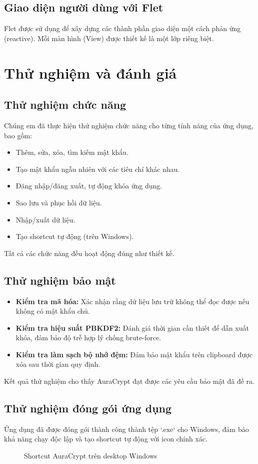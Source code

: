 \subsection{Giao diện người dùng với Flet}
Flet được sử dụng để xây dựng các thành phần giao diện một cách phản ứng (reactive). Mỗi màn hình (View) được thiết kế là một lớp riêng biệt.


\section{Thử nghiệm và đánh giá}
\subsection{Thử nghiệm chức năng}
Chúng em đã thực hiện thử nghiệm chức năng cho từng tính năng của ứng dụng, bao gồm:
\begin{itemize}
    \item Thêm, sửa, xóa, tìm kiếm mật khẩu.
    \item Tạo mật khẩu ngẫu nhiên với các tiêu chí khác nhau.
    \item Đăng nhập/đăng xuất, tự động khóa ứng dụng.
    \item Sao lưu và phục hồi dữ liệu.
    \item Nhập/xuất dữ liệu.
    \item Tạo shortcut tự động (trên Windows).
\end{itemize}
Tất cả các chức năng đều hoạt động đúng như thiết kế.

\subsection{Thử nghiệm bảo mật}
\begin{itemize}
    \item \textbf{Kiểm tra mã hóa:} Xác nhận rằng dữ liệu lưu trữ không thể đọc được nếu không có mật khẩu chủ.
    \item \textbf{Kiểm tra hiệu suất PBKDF2:} Đánh giá thời gian cần thiết để dẫn xuất khóa, đảm bảo độ trễ hợp lý chống brute-force.
    \item \textbf{Kiểm tra làm sạch bộ nhớ đệm:} Đảm bảo mật khẩu trên clipboard được xóa sau thời gian quy định.
\end{itemize}
Kết quả thử nghiệm cho thấy AuraCrypt đạt được các yêu cầu bảo mật đã đề ra.

\subsection{Thử nghiệm đóng gói ứng dụng}
Ứng dụng đã được đóng gói thành công thành tệp `.exe` cho Windows, đảm bảo khả năng chạy độc lập và tạo shortcut tự động với icon chính xác.
\begin{figure}[H]
    \centering
    \caption{Shortcut AuraCrypt trên desktop Windows}
    \label{fig:desktop_shortcut}
\end{figure}
\newpage